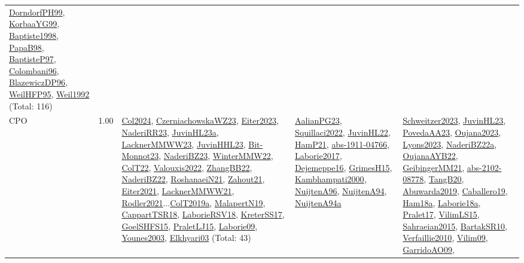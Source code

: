 {\begin{longtable}{p{3cm}r>{\raggedright\arraybackslash}p{6cm}>{\raggedright\arraybackslash}p{6cm}>{\raggedright\arraybackslash}p{8cm}}
\hyperref[detail:DorndorfPH99]{DorndorfPH99}, \hyperref[detail:KorbaaYG99]{KorbaaYG99}, \hyperref[detail:Baptiste1998]{Baptiste1998}, \hyperref[detail:PapaB98]{PapaB98}, \hyperref[detail:BaptisteP97]{BaptisteP97}, \hyperref[detail:Colombani96]{Colombani96}, \hyperref[detail:BlazewiczDP96]{BlazewiczDP96}, \hyperref[detail:WeilHFP95]{WeilHFP95}, \hyperref[detail:Weil1992]{Weil1992} (Total: 116)\\
\index{CPO}\index{CPSystems!CPO}CPO &  1.00 & \hyperref[detail:Col2024]{Col2024}, \hyperref[detail:CzerniachowskaWZ23]{CzerniachowskaWZ23}, \hyperref[detail:Eiter2023]{Eiter2023}, \hyperref[detail:NaderiRR23]{NaderiRR23}, \hyperref[detail:JuvinHL23a]{JuvinHL23a}, \hyperref[detail:LacknerMMWW23]{LacknerMMWW23}, \hyperref[detail:JuvinHHL23]{JuvinHHL23}, \hyperref[detail:Bit-Monnot23]{Bit-Monnot23}, \hyperref[detail:NaderiBZ23]{NaderiBZ23}, \hyperref[detail:WinterMMW22]{WinterMMW22}, \hyperref[detail:ColT22]{ColT22}, \hyperref[detail:Valouxis2022]{Valouxis2022}, \hyperref[detail:ZhangBB22]{ZhangBB22}, \hyperref[detail:NaderiBZ22]{NaderiBZ22}, \hyperref[detail:RoshanaeiN21]{RoshanaeiN21}, \hyperref[detail:Zahout21]{Zahout21}, \hyperref[detail:Eiter2021]{Eiter2021}, \hyperref[detail:LacknerMMWW21]{LacknerMMWW21}, \hyperref[detail:Rodler2021]{Rodler2021}...\hyperref[detail:ColT2019a]{ColT2019a}, \hyperref[detail:MalapertN19]{MalapertN19}, \hyperref[detail:CappartTSR18]{CappartTSR18}, \hyperref[detail:LaborieRSV18]{LaborieRSV18}, \hyperref[detail:KreterSS17]{KreterSS17}, \hyperref[detail:GoelSHFS15]{GoelSHFS15}, \hyperref[detail:PraletLJ15]{PraletLJ15}, \hyperref[detail:Laborie09]{Laborie09}, \hyperref[detail:Younes2003]{Younes2003}, \hyperref[detail:Elkhyari03]{Elkhyari03} (Total: 43) & \hyperref[detail:AalianPG23]{AalianPG23}, \hyperref[detail:Squillaci2022]{Squillaci2022}, \hyperref[detail:JuvinHL22]{JuvinHL22}, \hyperref[detail:HamP21]{HamP21}, \hyperref[detail:abs-1911-04766]{abs-1911-04766}, \hyperref[detail:Laborie2017]{Laborie2017}, \hyperref[detail:Dejemeppe16]{Dejemeppe16}, \hyperref[detail:GrimesH15]{GrimesH15}, \hyperref[detail:Kambhampati2000]{Kambhampati2000}, \hyperref[detail:NuijtenA96]{NuijtenA96}, \hyperref[detail:NuijtenA94]{NuijtenA94}, \hyperref[detail:NuijtenA94a]{NuijtenA94a} & \hyperref[detail:Schweitzer2023]{Schweitzer2023}, \hyperref[detail:JuvinHL23]{JuvinHL23}, \hyperref[detail:PovedaAA23]{PovedaAA23}, \hyperref[detail:Oujana2023]{Oujana2023}, \hyperref[detail:Lyons2023]{Lyons2023}, \hyperref[detail:NaderiBZ22a]{NaderiBZ22a}, \hyperref[detail:OujanaAYB22]{OujanaAYB22}, \hyperref[detail:GeibingerMM21]{GeibingerMM21}, \hyperref[detail:abs-2102-08778]{abs-2102-08778}, \hyperref[detail:TangB20]{TangB20}, \hyperref[detail:Abuwarda2019]{Abuwarda2019}, \hyperref[detail:Caballero19]{Caballero19}, \hyperref[detail:Ham18a]{Ham18a}, \hyperref[detail:Laborie18a]{Laborie18a}, \hyperref[detail:Pralet17]{Pralet17}, \hyperref[detail:VilimLS15]{VilimLS15}, \hyperref[detail:Sahraeian2015]{Sahraeian2015}, \hyperref[detail:BartakSR10]{BartakSR10}, \hyperref[detail:Verfaillie2010]{Verfaillie2010}, \hyperref[detail:Vilim09]{Vilim09}, \hyperref[detail:GarridoAO09]{GarridoAO09}, 
\end{longtable}}
